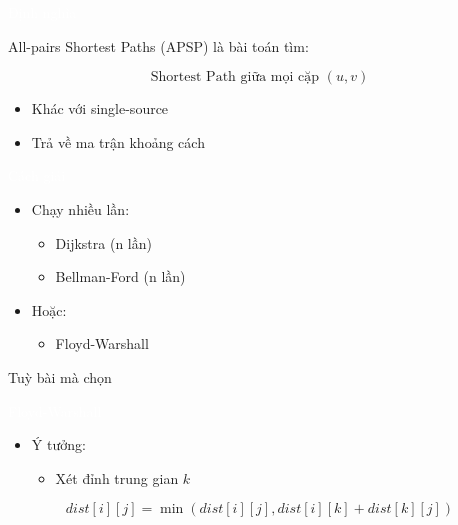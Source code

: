 \documentclass{beamer}
\title{\hlred{All-pairs Shortest Paths}}
\author{Group 3}
\date{\hlcyan{03/2026}}
\newcommand{\hlblue}[1]{\textcolor{myblue}{#1}}
\newcommand{\hlgreen}[1]{\textcolor{mygreen}{#1}}
\newcommand{\hlred}[1]{\textcolor{myred}{#1}}
\newcommand{\hlpurple}[1]{\textcolor{mypurple}{#1}}
\newcommand{\hlcyan}[1]{\textcolor{mycyan}{#1}}
\newcommand{\hlwhite}[1]{\textcolor{white}{#1}}
\begin{document}
\frame{\titlepage}


\begin{frame}{\hlwhite{Định nghĩa}}
\begin{tcolorbox}[title=\textbf{\hlwhite{Khái niệm}}]
\hlblue{All-pairs Shortest Paths (APSP)} là bài toán tìm:

\[
\text{Shortest Path giữa mọi cặp } (u, v)
\]
\end{tcolorbox}

\begin{itemize}
\item Khác với \hlgreen{single-source}
\item Trả về ma trận khoảng cách
\end{itemize}
\end{frame}


\begin{frame}{\hlwhite{Cách giải}}
\begin{itemize}
\item Chạy nhiều lần:
\begin{itemize}
\item \hlblue{Dijkstra} (n lần)
\item \hlred{Bellman-Ford} (n lần)
\end{itemize}

\item Hoặc:
\begin{itemize}
\item \hlpurple{Floyd-Warshall}
\end{itemize}
\end{itemize}

\begin{tcolorbox}
\centering
\hlcyan{Tuỳ bài mà chọn}
\end{tcolorbox}
\end{frame}


\begin{frame}{\hlwhite{Floyd-Warshall}}
\begin{itemize}
\item Ý tưởng:
\begin{itemize}
\item Xét đỉnh trung gian $k$
\end{itemize}
\end{itemize}

\begin{tcolorbox}
\centering
\[
dist[i][j] = \min(dist[i][j], dist[i][k] + dist[k][j])
\]
\end{tcolorbox}
\end{frame}
\end{document}
